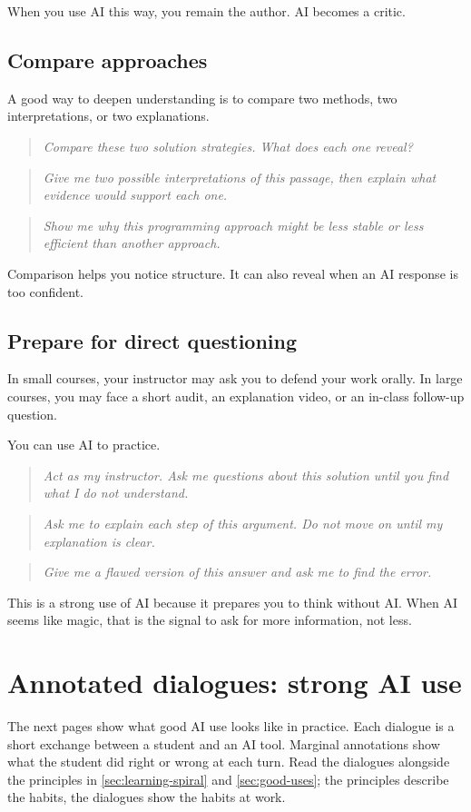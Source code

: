 \documentclass{SIAMbook2023}
\newcommand{\studentprompt}[1]{\begin{quote}\small\itshape #1\end{quote}}
\begin{document}
When you use AI this way, you remain the author. AI becomes a critic.

\subsection{Compare approaches}
\label{subsec:compare}

A good way to deepen understanding is to compare two methods, two interpretations, or two explanations.

\studentprompt{Compare these two solution strategies. What does each one reveal?}

\studentprompt{Give me two possible interpretations of this passage, then explain what evidence would support each one.}

\studentprompt{Show me why this programming approach might be less stable or less efficient than another approach.}

Comparison helps you notice structure. It can also reveal when an AI response is too confident.

\subsection{Prepare for direct questioning}
\label{subsec:direct-questioning}

In small courses, your instructor may ask you to defend your work orally. In large courses, you may face a short audit, an explanation video, or an in-class follow-up question.

You can use AI to practice.

\studentprompt{Act as my instructor. Ask me questions about this solution until you find what I do not understand.}

\studentprompt{Ask me to explain each step of this argument. Do not move on until my explanation is clear.}

\studentprompt{Give me a flawed version of this answer and ask me to find the error.}

This is a strong use of AI because it prepares you to think without AI. When AI seems like magic, that is the signal to ask for more information, not less.

\section{Annotated dialogues: strong AI use}
\label{sec:dialogues-strong}

The next pages show what good AI use looks like in practice. Each dialogue is a short exchange between a student and an AI tool. Marginal annotations show what the student did right or wrong at each turn. Read the dialogues alongside the principles in \cref{sec:learning-spiral} and \cref{sec:good-uses}; the principles describe the habits, the dialogues show the habits at work.
\end{document}
